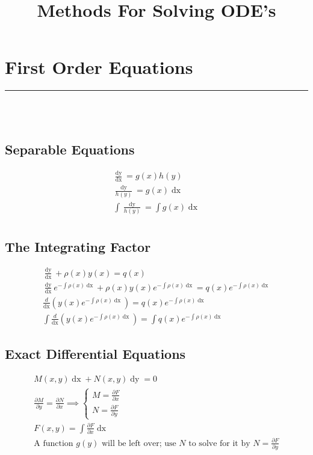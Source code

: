 \documentclass{article}
\title{Methods For Solving ODE's}
\date{}
\newcommand{\dy}{\mathop{dy}}
\newcommand{\dx}{\mathop{dx}}
\newcommand{\dydx}{\frac{\dy}{\dx}}
\newcommand{\ptl}{\partial}
\begin{document}
\maketitle
\section{First Order Equations}
\hrule
\noindent\\\\
\begin{minipage}[t]{0.5\textwidth}
\subsection{Separable Equations}
\begin{gather*}
\frac{\dy}{\dx} = g(x)h(y)\\
\frac{\dy}{h(y)} = g(x)\dx\\
\int \frac{\dy}{h(y)} = \int g(x)\dx\\
\end{gather*}
\end{minipage}
\begin{minipage}[t]{0.5\textwidth}
\subsection{The Integrating Factor}
\begin{gather*}
\dydx + \rho(x)y(x) = q(x)\\
\dydx e^{-\int \rho(x)\dx} + \rho(x)y(x)e^{-\int \rho(x)\dx} = q(x)e^{-\int \rho(x)\dx}\\
\frac{d}{\dx}\left(y(x)e^{-\int \rho(x)\dx}\right) = q(x)e^{-\int \rho(x)\dx}\\
\int\frac{d}{\dx}\left(y(x)e^{-\int \rho(x)\dx}\right) = \int q(x)e^{-\int \rho(x)\dx}
\end{gather*}
\end{minipage}
\subsection{Exact Differential Equations}
\begin{gather*}
M(x,y)\dx + N(x,y)\dy = 0\\
\frac{\ptl M}{\ptl y} = \frac{\ptl N}{\ptl x} \implies 
\begin{cases}
M = \frac{\ptl F}{\ptl x}\\
N = \frac{\ptl F}{\ptl y}
\end{cases}\\
F(x,y) = \int \frac{\ptl F}{\ptl x}\dx\\
\text{A function $g(y)$ will be left over; use $N$ to solve for it by $N = \frac{\ptl F}{\ptl y}$}
\end{gather*}
\newpage
\end{document}
